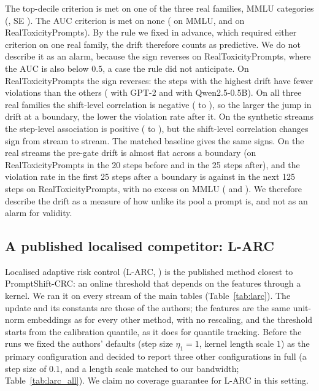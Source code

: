 The top-decile criterion is met on one of the three real families, MMLU categories (\TraceMmluTop{}, SE \TraceMmluTopSE{}). The AUC criterion is met on none (\TraceMmluAuc{} on MMLU, \TraceRtpAuc{} and \TraceRtpQAuc{} on RealToxicityPrompts). By the rule we fixed in advance, which required either criterion on one real family, the drift therefore counts as predictive. We do not describe it as an alarm, because the sign reverses on RealToxicityPrompts, where the AUC is also below $0.5$, a case the rule did not anticipate. On RealToxicityPrompts the sign reverses: the steps with the highest drift have fewer violations than the others (\TraceRtpTop{} with GPT-2 and \TraceRtpQTop{} with Qwen2.5-0.5B). On all three real families the shift-level correlation is negative (\TraceRealRhoLo{} to \TraceRealRhoHi{}), so the larger the jump in drift at a boundary, the lower the violation rate after it. On the synthetic streams the step-level association is positive (\TraceSynTopLo{} to \TraceSynTopHi{}), but the shift-level correlation changes sign from stream to stream. The matched baseline gives the same signs. On the real streams the pre-gate drift is almost flat across a boundary (on RealToxicityPrompts \TraceRtpDBefore{} in the 20 steps before and \TraceRtpDAfter{} in the 25 steps after), and the violation rate in the first 25 steps after a boundary is \TraceRtpErrFirst{} against \TraceRtpErrLater{} in the next 125 steps on RealToxicityPrompts, with no excess on MMLU (\TraceMmluErrFirst{} and \TraceMmluErrLater{}). We therefore describe the drift as a measure of how unlike its pool a prompt is, and not as an alarm for validity.

\subsection{A published localised competitor: L-ARC}\label{sec:res-larc}

Localised adaptive risk control (L-ARC, \citealp{zecchin2024localized}) is the published method closest to PromptShift-CRC: an online threshold that depends on the features through a kernel. We ran it on every stream of the main tables (Table~\ref{tab:larc}). The update and its constants are those of the authors; the features are the same unit-norm embeddings as for every other method, with no rescaling, and the threshold starts from the calibration quantile, as it does for quantile tracking. Before the runs we fixed the authors' defaults (step size $\eta_1=1$, kernel length scale $1$) as the primary configuration and decided to report three other configurations in full (a step size of $0.1$, and a length scale matched to our bandwidth; Table~\ref{tab:larc_all}). We claim no coverage guarantee for L-ARC in this setting.

